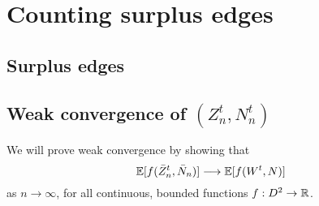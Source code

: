 
\chapter{Counting surplus edges}

\section{Surplus edges}

\begin{figure}
	
\end{figure}

\section{Weak convergence of $(Z^t_n, N^t_n)$}


We will prove weak convergence by showing that
\begin{equation}
\mathbb{E}[ f(\bar{Z}^t_n, \bar{N}_n) ] \longrightarrow \mathbb{E}[ f(W^t, N) ]
\end{equation}
as $n \rightarrow \infty$, 
for all continuous, bounded functions 
$f: D^2 \rightarrow \mathbb{R}$.
